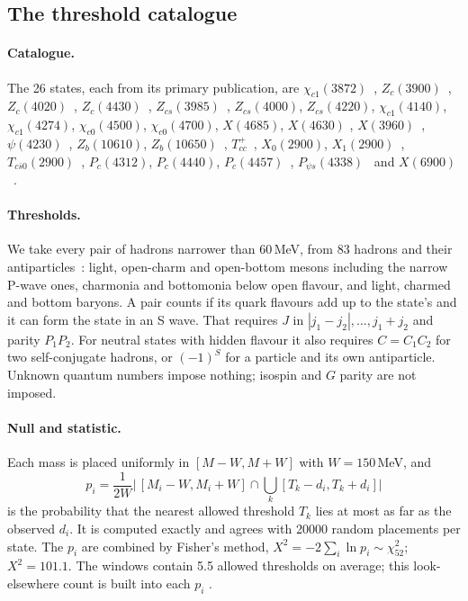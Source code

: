 \subsection{The threshold catalogue}\label{app:exotics-thresholds}

\paragraph{Catalogue.} The 26 states, each from its primary publication, are $\chi_{c1}(3872)$~\cite{lhcb2020k,lhcb2013h},
$Z_c(3900)$~\cite{besiii2013h,besiii2017h}, $Z_c(4020)$~\cite{besiii2013i}, $Z_c(4430)$~\cite{lhcb2014h}, $Z_{cs}(3985)$~\cite{besiii2021h},
$Z_{cs}(4000)$, $Z_{cs}(4220)$, $\chi_{c1}(4140)$, $\chi_{c1}(4274)$, $\chi_{c0}(4500)$, $\chi_{c0}(4700)$, $X(4685)$, $X(4630)$
\cite{lhcb2021i,lhcb2017h}, $X(3960)$~\cite{lhcb2023i}, $\psi(4230)$~\cite{besiii2017i}, $Z_b(10610)$, $Z_b(10650)$~\cite{belle2012h},
$T_{cc}^+$~\cite{lhcb2022i}, $X_0(2900)$, $X_1(2900)$~\cite{lhcb2020i}, $T_{c\bar s0}(2900)$~\cite{lhcb2023h}, $P_c(4312)$, $P_c(4440)$,
$P_c(4457)$~\cite{lhcb2019h}, $P_{\psi s}(4338)$~\cite{lhcb2023j} and $X(6900)$~\cite{lhcb2020h}.

\paragraph{Thresholds.} We take every pair of hadrons narrower than 60\,MeV, from 83 hadrons and their antiparticles~\cite{navas2024}:
light, open-charm and open-bottom mesons including the narrow P-wave ones, charmonia and bottomonia below open flavour, and light,
charmed and bottom baryons. A pair counts if its quark flavours add up to the state's and it can form the state in an S wave. That
requires $J$ in $|j_1-j_2|,\dots,j_1+j_2$ and parity $P_1P_2$. For neutral states with hidden flavour it also requires $C=C_1C_2$ for two
self-conjugate hadrons, or $(-1)^S$ for a particle and its own antiparticle. Unknown quantum numbers impose nothing; isospin and $G$ parity
are not imposed.

\paragraph{Null and statistic.} Each mass is placed uniformly in $[M-W,M+W]$ with $W=150$\,MeV, and
\begin{equation}\label{eq:exo-p}
p_i=\frac{1}{2W}\Big|\,[M_i-W,M_i+W]\cap\bigcup_k[T_k-d_i,T_k+d_i]\Big|
\end{equation}
is the probability that the nearest allowed threshold $T_k$ lies at most as far as the observed $d_i$. It is computed exactly and agrees
with 20000 random placements per state. The $p_i$ are combined by Fisher's method, $X^2=-2\sum_i\ln p_i\sim\chi^2_{52}$; $X^2=101.1$.
The windows contain 5.5 allowed thresholds on average; this look-elsewhere count is built into each $p_i$ .

